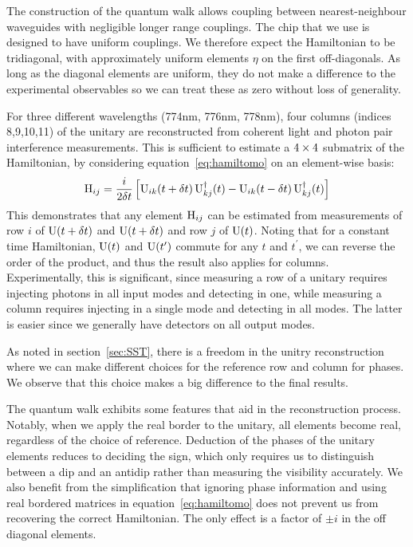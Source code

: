 The construction of the quantum walk allows coupling between nearest-neighbour
waveguides with negligible longer range couplings. The chip that we use is
designed to have uniform couplings. We therefore expect the Hamiltonian to be
tridiagonal, with approximately uniform elements \(\eta\) on the first
off-diagonals. As long as the diagonal elements are uniform, they do not make a
difference to the experimental observables so we can treat these as zero without
loss of generality.

For three different wavelengths (774nm, 776nm, 778nm), four columns (indices
8,9,10,11) of the unitary are reconstructed from coherent light and photon pair
interference measurements. This is sufficient to estimate a \(4 \times 4\)
submatrix of the Hamiltonian, by considering equation~\ref{eq:hamiltomo} on an
element-wise basis:
\begin{equation}
  \mathrm{H}_{ij} = \frac{i}{2 \delta t} \left[ \mathrm{U}_{ik} \!\left( t+\delta t \right) \mathrm{U}_{kj}^{
  \dagger} \!\left(t\right) - \mathrm{U}_{ik} \!\left( t-\delta t \right) \mathrm{U}_{kj}^{\dagger} \!\left(t\right)
  \right]
\end{equation}
This demonstrates that any element \(\mathrm{H}_{ij}\) can be estimated from
measurements of row \(i\) of \(\mathrm{U} \!\left(t+\delta t\right)\) and \(\mathrm{U} \!\left(t+\delta t\right)\)
and row \(j\) of \(\mathrm{U} \!\left(t\right)\). Noting that for a constant time
Hamiltonian, \(\mathrm{U} \!\left(t\right)\) and \(\mathrm{U} \!\left(t^{\prime}\right)\) commute for any
\(t\) and \(t^{\prime}\), we can reverse the order of the product, and thus the
result also applies for columns. Experimentally, this is significant, since
measuring a row of a unitary requires injecting photons in all input modes and
detecting in one, while measuring a column requires injecting in a single mode
and detecting in all modes. The latter is easier since we generally have
detectors on all output modes.

As noted in section~\ref{sec:SST}, there is a freedom in the unitry
reconstruction where we can make different choices for the reference row and
column for phases. We observe that this choice makes a big difference to the
final results.

The quantum walk exhibits some features that aid in the reconstruction process.
Notably, when we apply the real border to the unitary, all elements become real,
regardless of the choice of reference. Deduction of the phases of the unitary
elements reduces to deciding the sign, which only requires us to distinguish
between a dip and an antidip rather than measuring the visibility accurately. We
also benefit from the simplification that ignoring phase information and using
real bordered matrices in equation~\ref{eq:hamiltomo} does not prevent us from
recovering the correct Hamiltonian. The only effect is a factor of \(\pm i\) in
the off diagonal elements.

